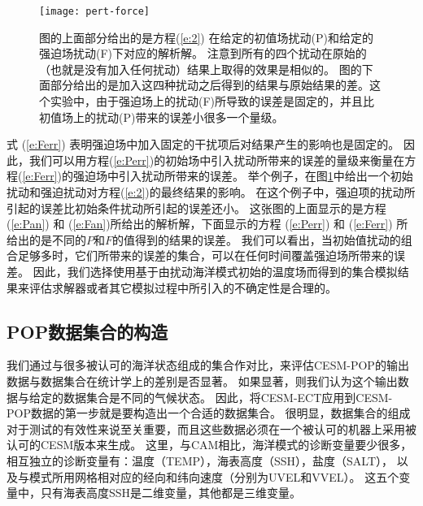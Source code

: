\begin {figure} 
\centering
\texttt{[image: pert-force]}
\caption{ 图的上面部分给出的是方程(\ref{e:2}) 在给定的初值场扰动(P)和给定的强迫场扰动(F)下对应的解析解。
注意到所有的四个扰动在原始的（也就是没有加入任何扰动）结果上取得的效果是相似的。 图的下面部分给出的是加入这四种扰动之后得到的结果与原始结果的差。这个实验中，由于强迫场上的扰动(F)所导致的误差是固定的，并且比初值场上的扰动(P)带来的误差小很多一个量级。}
\label {fig:1Danalytical}
\end {figure}

式 (\ref{e:Ferr}) 表明强迫场中加入固定的干扰项后对结果产生的影响也是固定的。
因此，我们可以用方程(\ref{e:Perr})的初始场中引入扰动所带来的误差的量级来衡量在方程(\ref{e:Ferr})的强迫场中引入扰动所带来的误差。 
举个例子，在图\ref{fig:1Danalytical}中给出一个初始扰动和强迫扰动对方程(\ref{e:2})的最终结果的影响。
在这个例子中，强迫项的扰动所引起的误差比初始条件扰动所引起的误差还小。
这张图的上面显示的是方程(\ref{e:Pan}) 和 (\ref{e:Fan})所给出的解析解，下面显示的方程 (\ref{e:Perr}) 和 (\ref{e:Ferr}) 所给出的是不同的$P$和$F$的值得到的结果的误差。
我们可以看出，当初始值扰动的组合足够多时，它们所带来的误差的集合，可以在任何时间覆盖强迫场所带来的误差。 
因此，我们选择使用基于由扰动海洋模式初始的温度场而得到的集合模拟结果来评估求解器或者其它模拟过程中所引入的不确定性是合理的。



\subsection{POP数据集合的构造}\label{verify:createEns}

 
我们通过与很多被认可的海洋状态组成的集合作对比，来评估CESM-POP的输出数据与数据集合在统计学上的差别是否显著。
如果显著，则我们认为这个输出数据与给定的数据集合是不同的气候状态。 
因此，将CESM-ECT应用到CESM-POP数据的第一步就是要构造出一个合适的数据集合。 
很明显，数据集合的组成对于测试的有效性来说至关重要，而且这些数据必须在一个被认可的机器上采用被认可的CESM版本来生成。
这里，与CAM相比，海洋模式的诊断变量要少很多，相互独立的诊断变量有：温度（TEMP），海表高度（SSH），盐度（SALT）， 以及与模式所用网格相对应的经向和纬向速度（分别为UVEL和VVEL）。
这五个变量中，只有海表高度SSH是二维变量，其他都是三维变量。 

